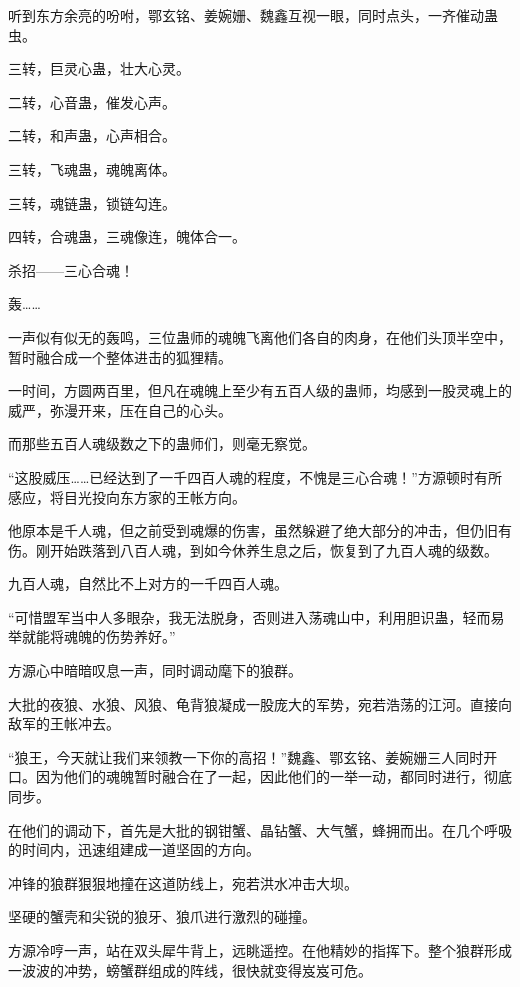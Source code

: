 
\begin{this_body}

听到东方余亮的吩咐，鄂玄铭、姜婉姗、魏鑫互视一眼，同时点头，一齐催动蛊虫。

三转，巨灵心蛊，壮大心灵。

二转，心音蛊，催发心声。

二转，和声蛊，心声相合。

三转，飞魂蛊，魂魄离体。

三转，魂链蛊，锁链勾连。

四转，合魂蛊，三魂像连，魄体合一。

杀招——三心合魂！

轰……

一声似有似无的轰鸣，三位蛊师的魂魄飞离他们各自的肉身，在他们头顶半空中，暂时融合成一个整体进击的狐狸精。

一时间，方圆两百里，但凡在魂魄上至少有五百人级的蛊师，均感到一股灵魂上的威严，弥漫开来，压在自己的心头。

而那些五百人魂级数之下的蛊师们，则毫无察觉。

“这股威压……已经达到了一千四百人魂的程度，不愧是三心合魂！”方源顿时有所感应，将目光投向东方家的王帐方向。

他原本是千人魂，但之前受到魂爆的伤害，虽然躲避了绝大部分的冲击，但仍旧有伤。刚开始跌落到八百人魂，到如今休养生息之后，恢复到了九百人魂的级数。

九百人魂，自然比不上对方的一千四百人魂。

“可惜盟军当中人多眼杂，我无法脱身，否则进入荡魂山中，利用胆识蛊，轻而易举就能将魂魄的伤势养好。”

方源心中暗暗叹息一声，同时调动麾下的狼群。

大批的夜狼、水狼、风狼、龟背狼凝成一股庞大的军势，宛若浩荡的江河。直接向敌军的王帐冲去。

“狼王，今天就让我们来领教一下你的高招！”魏鑫、鄂玄铭、姜婉姗三人同时开口。因为他们的魂魄暂时融合在了一起，因此他们的一举一动，都同时进行，彻底同步。

在他们的调动下，首先是大批的钢钳蟹、晶钻蟹、大气蟹，蜂拥而出。在几个呼吸的时间内，迅速组建成一道坚固的方向。

冲锋的狼群狠狠地撞在这道防线上，宛若洪水冲击大坝。

坚硬的蟹壳和尖锐的狼牙、狼爪进行激烈的碰撞。

方源冷哼一声，站在双头犀牛背上，远眺遥控。在他精妙的指挥下。整个狼群形成一波波的冲势，螃蟹群组成的阵线，很快就变得岌岌可危。


\end{this_body}
